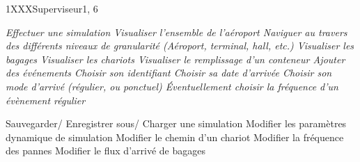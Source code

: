\phtu
{1}{XXX}{Superviseur}{1, 6}
{
	\it{} Effectuer une simulation
		\sit{} Visualiser l'ensemble de l'aéroport
			\ssit{} Naviguer au travers des différents niveaux de granularité (Aéroport, terminal, hall, \textsl{etc.})
			\ssit{} Visualiser les bagages
			\ssit{} Visualiser les chariots
			\ssit{} Visualiser le remplissage d'un conteneur
		\sit{} Ajouter des événements
			\ssit{} Choisir son identifiant
			\ssit{} Choisir sa date d'arrivée
			\ssit{} Choisir son mode d'arrivé (régulier, ou ponctuel)
			\ssit{} Éventuellement choisir la fréquence d'un évènement régulier

		\sit{} Sauvegarder/ Enregistrer sous/ Charger une simulation
		\sit{} Modifier les paramètres dynamique de simulation
			\ssit{} Modifier le chemin d'un chariot	
			\ssit{} Modifier la fréquence des pannes
			\ssit{} Modifier le flux d'arrivé de bagages
}
